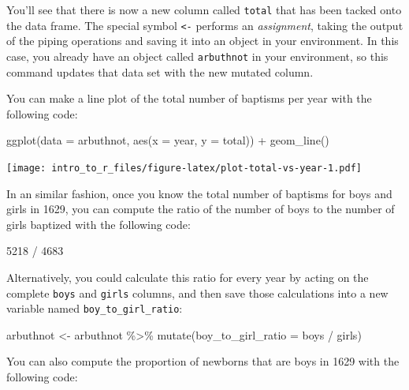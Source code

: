 \documentclass[
]{article}
\newenvironment{Shaded}{\begin{snugshade}}{\end{snugshade}}
\newcommand{\AttributeTok}[1]{\textcolor[rgb]{0.77,0.63,0.00}{#1}}
\newcommand{\DecValTok}[1]{\textcolor[rgb]{0.00,0.00,0.81}{#1}}
\newcommand{\FunctionTok}[1]{\textcolor[rgb]{0.00,0.00,0.00}{#1}}
\newcommand{\NormalTok}[1]{#1}
\newcommand{\OtherTok}[1]{\textcolor[rgb]{0.56,0.35,0.01}{#1}}
\newcommand{\SpecialCharTok}[1]{\textcolor[rgb]{0.00,0.00,0.00}{#1}}
\begin{document}
You'll see that there is now a new column called \texttt{total} that has been tacked onto the data frame. The special symbol \texttt{\textless{}-} performs an \emph{assignment}, taking the output of the piping operations and saving it into an object in your environment. In this case, you already have an object called \texttt{arbuthnot} in your environment, so this command updates that data set with the new mutated column.

You can make a line plot of the total number of baptisms per year with the following code:

\begin{Shaded}
\begin{Highlighting}[]
\FunctionTok{ggplot}\NormalTok{(}\AttributeTok{data =}\NormalTok{ arbuthnot, }\FunctionTok{aes}\NormalTok{(}\AttributeTok{x =}\NormalTok{ year, }\AttributeTok{y =}\NormalTok{ total)) }\SpecialCharTok{+} 
  \FunctionTok{geom\_line}\NormalTok{()}
\end{Highlighting}
\end{Shaded}

\texttt{[image: intro\_to\_r\_files/figure-latex/plot-total-vs-year-1.pdf]}

In an similar fashion, once you know the total number of baptisms for boys and girls in 1629, you can compute the ratio of the number of boys to the number of girls baptized with the following code:

\begin{Shaded}
\begin{Highlighting}[]
\DecValTok{5218} \SpecialCharTok{/} \DecValTok{4683}
\end{Highlighting}
\end{Shaded}

Alternatively, you could calculate this ratio for every year by acting on the complete \texttt{boys} and \texttt{girls} columns, and then save those calculations into a new variable named \texttt{boy\_to\_girl\_ratio}:

\begin{Shaded}
\begin{Highlighting}[]
\NormalTok{arbuthnot }\OtherTok{\textless{}{-}}\NormalTok{ arbuthnot }\SpecialCharTok{\%\textgreater{}\%}
  \FunctionTok{mutate}\NormalTok{(}\AttributeTok{boy\_to\_girl\_ratio =}\NormalTok{ boys }\SpecialCharTok{/}\NormalTok{ girls)}
\end{Highlighting}
\end{Shaded}

You can also compute the proportion of newborns that are boys in 1629 with the following code:
\end{document}
